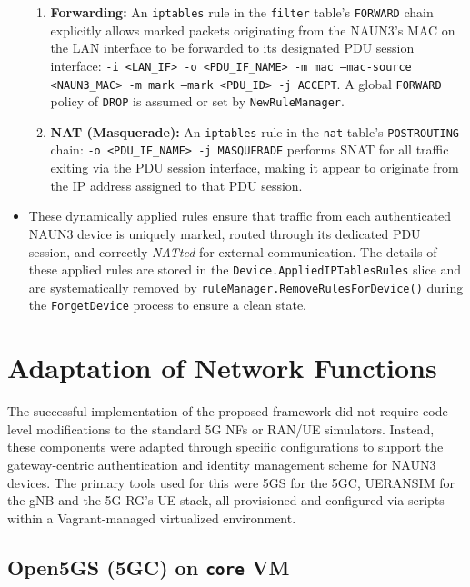 \begin{itemize}
{\begin{enumerate}
            \item \textbf{Forwarding:} An \texttt{iptables} rule in the \texttt{filter} table's \texttt{FORWARD} chain explicitly allows marked packets originating from the \ac{NAUN3}'s \ac{MAC} on the \ac{LAN} interface to be forwarded to its designated \ac{PDU} session interface: \texttt{-i <LAN\_IF> -o <PDU\_IF\_NAME> -m mac --mac-source <NAUN3\_MAC> -m mark --mark <PDU\_ID> -j ACCEPT}. A global \texttt{FORWARD} policy of \texttt{DROP} is assumed or set by \texttt{NewRuleManager}.
            
            \item \textbf{\ac{NAT} (Masquerade):} An \texttt{iptables} rule in the \texttt{nat} table's \texttt{POSTROUTING} chain: \texttt{-o <PDU\_IF\_NAME> -j MASQUERADE} performs \ac{SNAT} for all traffic exiting via the \ac{PDU} session interface, making it appear to originate from the \ac{IP} address assigned to that \ac{PDU} session.
        \end{enumerate}
    }
    
    \item These dynamically applied rules ensure that traffic from each authenticated \ac{NAUN3} device is uniquely marked, routed through its dedicated \ac{PDU} session, and correctly \textit{NATted} for external communication. The details of these applied rules are stored in the \texttt{Device.AppliedIPTablesRules} slice and are systematically removed by \texttt{ruleManager.RemoveRulesForDevice()} during the \texttt{ForgetDevice} process to ensure a clean state.
    
\end{itemize}

\section{Adaptation of Network Functions}

The successful implementation of the proposed framework did not require code-level modifications to the standard \ac{5G} \acp{NF} or \ac{RAN}/\ac{UE} simulators. Instead, these components were adapted through specific configurations to support the gateway-centric authentication and identity management scheme for \ac{NAUN3} devices. The primary tools used for this were \Open5GS for the \ac{5GC}, UERANSIM for the \ac{gNB} and the \ac{5G-RG}'s \ac{UE} stack, all provisioned and configured via scripts within a Vagrant-managed virtualized environment.

\subsection{Open5GS (\acs{5GC}) on \texttt{core} \acs{VM}}

